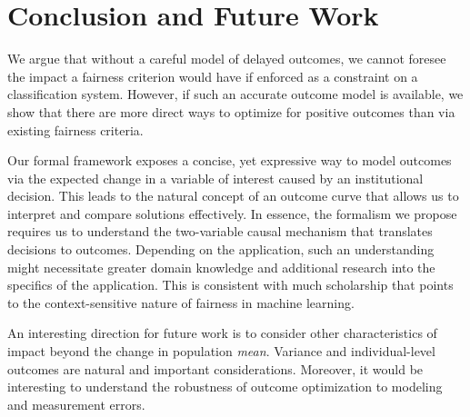 
\section{Conclusion and Future Work}

We argue that without a careful model of delayed outcomes, we
cannot foresee the impact a fairness criterion would have if enforced as a
constraint on a classification system. 
However, if such an accurate outcome model is available, we show that there are more direct 
ways to optimize for positive outcomes than via existing fairness criteria.

Our formal framework exposes a concise, yet expressive way to model outcomes via the expected
change in a variable of interest caused by an institutional decision. This leads to the natural
concept of an outcome curve that allows us to interpret and compare solutions
effectively.
%
In essence, the formalism we propose requires us to understand the two-variable
causal mechanism that translates decisions to outcomes. Depending on the
application, such an understanding might necessitate greater domain knowledge
and additional research into the specifics of the application. This is
consistent with much scholarship that points to the context-sensitive nature of
fairness in machine learning.

An interesting direction for future work is to consider other characteristics of
impact beyond the change in population \emph{mean}. Variance and
individual-level outcomes are natural and important considerations. Moreover, it
would be interesting to understand the robustness of outcome optimization to
modeling and measurement errors.
